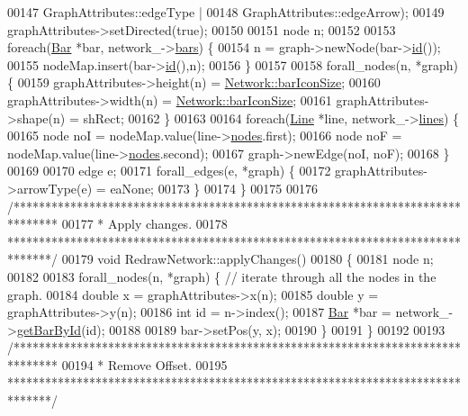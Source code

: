 \begin{DoxyCode}
00147                                         GraphAttributes::edgeType |
00148                                         GraphAttributes::edgeArrow);
00149   graphAttributes->setDirected(\textcolor{keyword}{true});
00150 
00151   node n;
00152 
00153   \textcolor{keywordflow}{foreach}(\hyperlink{class_bar}{Bar} *bar, network\_->\hyperlink{class_network_ae37a8418e42adf765b143cdc9d992b6c}{bars}) \{
00154     n = graph->newNode(bar->\hyperlink{group___models_gacf0fb781a73856bb7beb823304465e13}{id}());
00155     nodeMap.insert(bar->\hyperlink{group___models_gacf0fb781a73856bb7beb823304465e13}{id}(),n);
00156   \}
00157 
00158   forall\_nodes(n, *graph) \{
00159     graphAttributes->height(n) = \hyperlink{group___models_gaa334bbc93b3fde219840e95e23198b53}{Network::barIconSize};
00160     graphAttributes->width(n) = \hyperlink{group___models_gaa334bbc93b3fde219840e95e23198b53}{Network::barIconSize};
00161     graphAttributes->shape(n) = shRect;
00162   \}
00163 
00164   \textcolor{keywordflow}{foreach}(\hyperlink{class_line}{Line} *line, network\_->\hyperlink{class_network_a49659f95d02baf087707c5a94fa23d90}{lines}) \{
00165     node noI = nodeMap.value(line->\hyperlink{class_line_afd17c40d656e6a8d677cb22df5f0c70b}{nodes}.first);
00166     node noF = nodeMap.value(line->\hyperlink{class_line_afd17c40d656e6a8d677cb22df5f0c70b}{nodes}.second);
00167     graph->newEdge(noI, noF);
00168   \}
00169 
00170   edge e;
00171   forall\_edges(e, *graph) \{
00172     graphAttributes->arrowType(e) = eaNone;
00173   \}
00174 \}
00175 
00176 \textcolor{comment}{/*******************************************************************************}
00177 \textcolor{comment}{* Apply changes.}
00178 \textcolor{comment}{*******************************************************************************/}
00179 \textcolor{keywordtype}{void} RedrawNetwork::applyChanges()
00180 \{
00181   node n;
00182 
00183   forall\_nodes(n, *graph) \{  \textcolor{comment}{// iterate through all the nodes in the graph.}
00184     \textcolor{keywordtype}{double} x = graphAttributes->x(n);
00185     \textcolor{keywordtype}{double} y = graphAttributes->y(n);
00186     \textcolor{keywordtype}{int} \textcolor{keywordtype}{id} = n->index();
00187     \hyperlink{class_bar}{Bar} *bar = network\_->\hyperlink{group___models_ga04d524ce0fa0dd0d06deda92b1597af0}{getBarById}(\textcolor{keywordtype}{id});
00188 
00189     bar->setPos(y, x);
00190   \}
00191 \}
00192 
00193 \textcolor{comment}{/*******************************************************************************}
00194 \textcolor{comment}{* Remove Offset.}
00195 \textcolor{comment}{*******************************************************************************/}

\end{DoxyCode}

